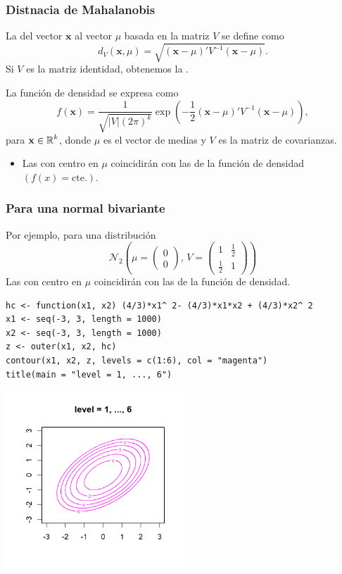 \subsubsection{Distnacia de Mahalanobis}
La  del vector $\mathbf{x}$ al vector $\mu$ basada en la matriz $V$ se define como \[ d_V(\mathbf{x},\mu)=\sqrt{(\mathbf{x}-\mu)'V^{-1}(\mathbf{x}-\mu)}. \]
Si $V$ es la matriz identidad, obtenemos la .

 La función de densidad se expresa como \[ f(\mathbf{x})=\dfrac{1}{\sqrt{|V|(2\pi)^k}}\exp\left(-\dfrac{1}{2}(\mathbf{x}-\mu)'V^{-1}(\mathbf{x}-\mu)\right), \]para $\mathbf{x}\in\operatorname{\mathbb{R}}^k$, donde $\mu$ es el vector de medias y $V$ es la matriz de covarianzas.
\begin{itemize}
	\item Las  con centro en $\mu$ coincidirán con las  de la función de densidad $(f(x)=\mathrm{cte}.).$
\end{itemize}
\subsubsection{Para una \textbf{normal bivariante}}
\begin{minipage}{0.4\textwidth}
	Por ejemplo, para una distribución\[ \mathcal{N}_2\left(\mu=\begin{pmatrix}
		0\\
		0
	\end{pmatrix},\,V=\begin{pmatrix}
	1 & \tfrac{1}{2}\\
	\tfrac{1}{2} & 1
	\end{pmatrix}\right) \]
	Las  con centro en $\mu$ coincidirán con las  de la función de densidad.
\end{minipage}\qquad\begin{minipage}{0.55\textwidth}
\begin{lstlisting}
hc <- function(x1, x2) (4/3)*x1^ 2- (4/3)*x1*x2 + (4/3)*x2^ 2
x1 <- seq(-3, 3, length = 1000)
x2 <- seq(-3, 3, length = 1000)
z <- outer(x1, x2, hc)
contour(x1, x2, z, levels = c(1:6), col = "magenta")
title(main = "level = 1, ..., 6")
\end{lstlisting}
\end{minipage}

\begin{flushright}
	\includegraphics[width=0.5\textwidth]{"Temas/Imágenes/Tema 5/screenshot001"}
\end{flushright}
